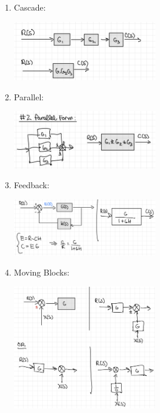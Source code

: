 \documentclass{article}
\begin{document}
\begin{enumerate}
\item Cascade:
  \begin{center}
    \includegraphics[width=0.5\textwidth]{images/cascade_blocks.png}
  \end{center}
\item Parallel:
  \begin{center}
    \includegraphics[width=0.5\textwidth]{images/parallel_blocks.png}
  \end{center}
\item Feedback:
  \begin{center}
    \includegraphics[width=0.5\textwidth]{images/feedback_blocks.png}
  \end{center}
\item Moving Blocks:
  \begin{center}
    \includegraphics[width=0.5\textwidth]{images/moving_blocks.png}
  \end{center}
\end{enumerate}
\end{document}

